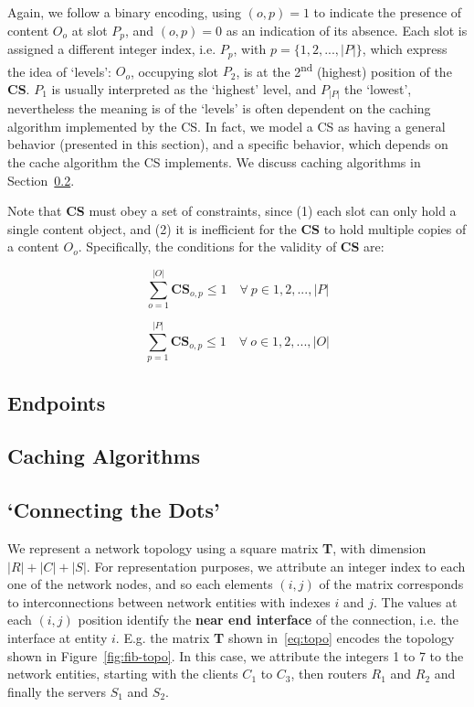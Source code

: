 Again, we follow a binary encoding, using $(o, p) = 1$ to indicate the 
presence of content $O_o$ at slot $P_p$, and $(o, p) = 0$ as an indication of 
its absence. Each slot is assigned a different integer 
index, i.e. $P_p$, with $p = \{1, 2, ..., |P|\}$, which express the idea of `levels': 
$O_o$, occupying slot $P_2$, is at the 2\textsuperscript{nd} 
(highest) position of the \textbf{CS}. $P_1$ is usually interpreted as the `highest' 
level, and $P_{|P|}$ the `lowest', nevertheless the meaning is of the `levels' 
is often dependent on the caching algorithm implemented by the CS. In fact, we 
model a CS as having a general behavior (presented in this section), and a specific 
behavior, which depends on the cache algorithm the CS implements. We discuss caching 
algorithms in Section~\ref{subsec:meth-caching-algs}.\shortvertbreak

Note that \textbf{CS} must obey a set of constraints, since (1) 
each slot can only hold a single content object, and (2) it is inefficient for 
the \textbf{CS} to hold multiple copies of a content $O_o$. Specifically, the 
conditions for the validity of \textbf{CS} are:

\begin{equation}
    \sum_{o=1}^{|O|} \textbf{CS}_{o,p} \le 1 \quad \forall \ p \in {1, 2, ..., |P|}
    \label{eq:cs-constraints-1}
\end{equation}

\begin{equation}
    \sum_{p=1}^{|P|} \textbf{CS}_{o,p} \le 1 \quad \forall \ o \in {1, 2, ..., |O|}
    \label{eq:cs-constraints-2}
\end{equation}\shortvertbreak

\subsection{Endpoints}
\label{subsec:meth-endpoints}

\subsection{Caching Algorithms}
\label{subsec:meth-caching-algs}

\subsection{`Connecting the Dots'}
\label{subsec:meth-conn-dots}

We represent a network topology using a square matrix \textbf{T}, 
with dimension $|R|+|C|+|S|$. For representation purposes, we attribute an 
integer index to each one of the network nodes, and so each elements $(i,j)$ of the 
matrix corresponds to interconnections between network entities with indexes $i$ and $j$. The 
values at each $(i,j)$ position identify the \textbf{near end interface} of the 
connection, i.e. the interface at entity $i$. E.g. the matrix \textbf{T} shown 
in~\ref{eq:topo} encodes the topology shown in Figure~\ref{fig:fib-topo}. In this case, 
we attribute the integers 1 to 7 to the network entities, starting with the 
clients $C_1$ to $C_3$, then routers $R_1$ and $R_2$ and 
finally the servers $S_1$ and $S_2$.

